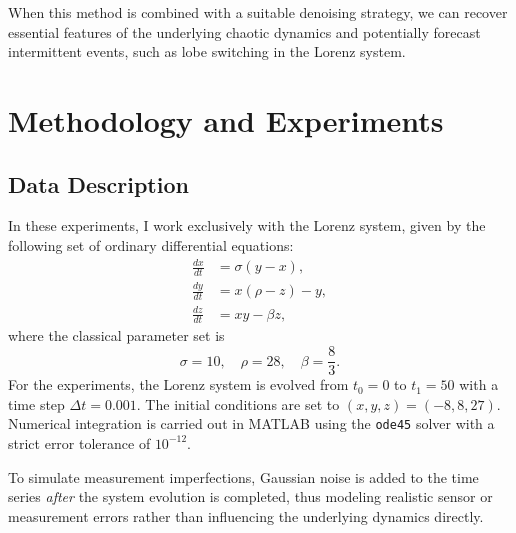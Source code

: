 \documentclass[11pt]{article}
\begin{document}
	When this method is combined with a suitable denoising strategy, we can recover essential features of the underlying chaotic dynamics and potentially forecast intermittent events, such as lobe switching in the Lorenz system.
	
	\section{Methodology and Experiments}
	
	\subsection{Data Description}
	In these experiments, I work exclusively with the Lorenz system, given by the following set of ordinary differential equations:
	\begin{equation}
		\begin{aligned}
			\frac{dx}{dt} &= \sigma (y - x),\\
			\frac{dy}{dt} &= x(\rho - z) - y,\\
			\frac{dz}{dt} &= xy - \beta z,
		\end{aligned}
		\label{eq:lorenz}
	\end{equation}
	where the classical parameter set is
	\[
	\sigma = 10, \quad \rho = 28, \quad \beta = \frac{8}{3}.
	\]
	For the experiments, the Lorenz system is evolved from \(t_0 = 0\) to \(t_1 = 50\) with a time step \(\Delta t = 0.001\). The initial conditions are set to \((x, y, z) = (-8, 8, 27)\). Numerical integration is carried out in MATLAB using the \texttt{ode45} solver with a strict error tolerance of \(10^{-12}\).
	
	To simulate measurement imperfections, Gaussian noise is added to the time series \emph{after} the system evolution is completed, thus modeling realistic sensor or measurement errors rather than influencing the underlying dynamics directly.
	
\end{document}
